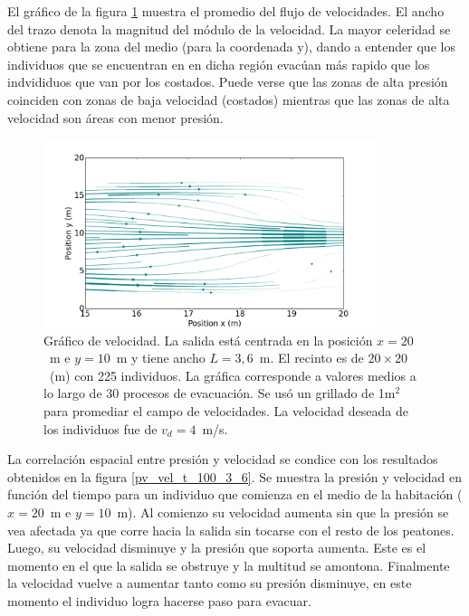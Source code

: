 El gráfico de la figura \ref{flujo_3_6} muestra el promedio del flujo de velocidades. El ancho del trazo denota la magnitud del módulo de la velocidad. La mayor celeridad se obtiene para la zona del medio (para la coordenada y), dando a entender que los individuos que se encuentran en en dicha región evacúan más rapido que los indvididuos que van por los costados. 
Puede verse que las zonas de alta presión coinciden con zonas de baja velocidad (costados) mientras que las zonas de alta velocidad son áreas con menor presión. 


\begin{figure}[H]
    \centering
    \includegraphics[height=5.5cm]{figuras/flujo_door_3_6m.png}
    \caption[width=5cm]{Gráfico de velocidad. La salida está centrada en la posición $x=20$~m e $y=10$~m y tiene ancho $L=3,6$~m. El recinto es de $20\times 20$~(m) con 225 individuos. La gráfica corresponde a valores medios a lo largo de 30 procesos de evacuación. Se usó un grillado de 1m$^2$ para promediar el campo de velocidades. La velocidad deseada de los individuos fue de $v_d=4$~m/s.}
    \label{flujo_3_6}
\end{figure}

La correlación espacial entre presión y velocidad se condice con los resultados obtenidos en la figura \ref{pv_vel_t_100_3_6}. Se muestra la presión y velocidad en función del tiempo para un individuo que comienza en el medio de la habitación ($x=20$~m e $y=10$~m). Al comienzo su velocidad aumenta sin que la presión se vea afectada ya que corre hacia la salida sin tocarse con el resto de los peatones. Luego, su velocidad disminuye y la presión que soporta aumenta. Este es el momento en el que la salida se obstruye y la multitud se amontona. Finalmente la velocidad vuelve a aumentar tanto como su presión disminuye, en este momento el individuo logra hacerse paso para evacuar. 

